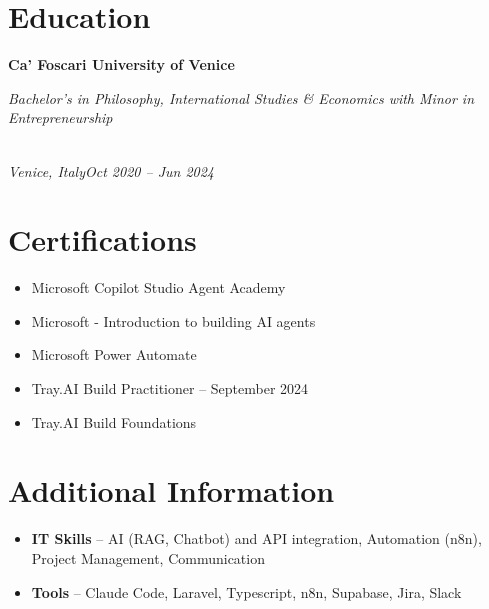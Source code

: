 \documentclass[a4paper,10pt]{article}
\newcommand{\role}[4]{\vspace{3pt}\noindent\hspace{0.6em}\parbox[t]{0.38\textwidth}{\raggedright\textbf{#1}}\hfill\parbox[t]{0.58\textwidth}{\raggedleft\textit{#2}}\\{\textit{#3}\hfill\textit{#4}}\vspace{1pt}}
\begin{document}
\section{Education}
\role{Ca' Foscari University of Venice}{Bachelor's in Philosophy, International Studies \& Economics with Minor in Entrepreneurship}{Venice, Italy}{Oct 2020 -- Jun 2024}

\section{Certifications}
\begin{itemize}
\item Microsoft Copilot Studio Agent Academy
\item Microsoft - Introduction to building AI agents
\item Microsoft Power Automate
\item Tray.AI Build Practitioner -- September 2024
\item Tray.AI Build Foundations
\end{itemize}

\section{Additional Information}
\begin{itemize}
\item \textbf{IT Skills} -- AI (RAG, Chatbot) and API integration, Automation (n8n), Project Management, Communication
\item \textbf{Tools} -- Claude Code, Laravel, Typescript, n8n, Supabase, Jira, Slack
\end{itemize}
\end{document}
